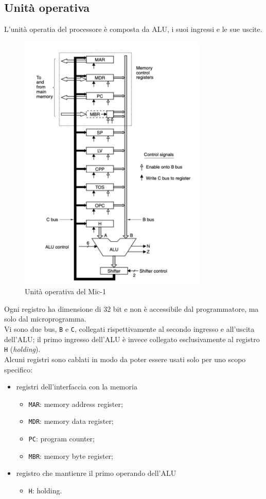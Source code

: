 \subsection{Unità operativa}
L'unità operatia del processore è composta da ALU, i suoi ingressi e le sue uscite.
\begin{figure}[H]
	\centering
	\includegraphics[width=0.8\textwidth]{img/Esercizio_9/uo_mic-1}
	\caption{Unità operativa del Mic-1}
	\label{uo_mic-1} 
\end{figure}
\noindent Ogni registro ha dimensione di 32 bit e non è accessibile dal programmatore, ma solo dal microprogramma.\\
Vi sono due bus, \texttt{B} e \texttt{C}, collegati rispettivamente al secondo ingresso e all'uscita dell'ALU; il primo ingresso dell'ALU è invece collegato esclusivamente al registro \texttt{H} (\textit{holding}).\\
Alcuni registri sono cablati in modo da poter essere usati solo per uno scopo specifico:
\begin{itemize}
    \item registri dell'interfaccia con la memoria 
    \begin{itemize}
        \item \texttt{MAR}: memory address register;
        \item \texttt{MDR}: memory data register;
        \item \texttt{PC}: program counter;
        \item \texttt{MBR}: memory byte register;
    \end{itemize}
    \item registro che mantienre il primo operando dell'ALU
    \begin{itemize}
        \item \texttt{H}: holding.
    \end{itemize}
\end{itemize}


